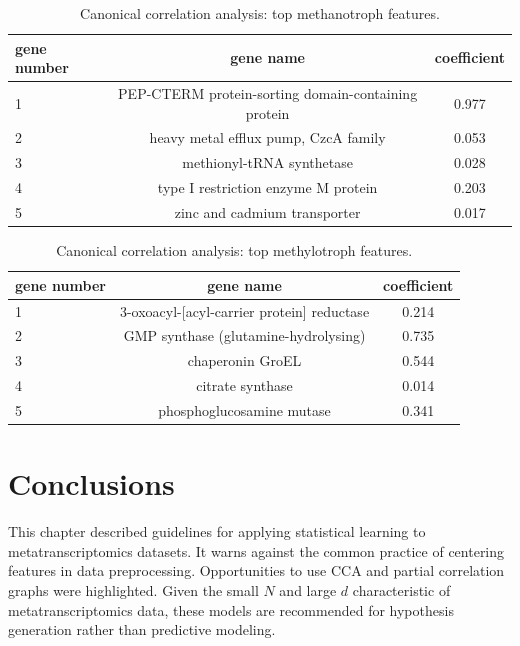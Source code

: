 \begin{table}[H]
\centering
\begin{singlespace}
\caption[Canonical correlation analysis: top methanotroph features]{Canonical correlation analysis: top methanotroph features.}
\begin{tabular}{l | c | c}
          gene number & gene name & coefficient  \\
\midrule
	1 & PEP-CTERM protein-sorting domain-containing  protein & 0.977  \\
	2 & heavy metal efflux pump, CzcA family &  0.053  \\
	3 & methionyl-tRNA synthetase &  0.028 \\
	4 & type I restriction enzyme M protein &  0.203 \\
	5 & zinc and cadmium transporter &  0.017 \\
\end{tabular}
\label{table:CCA_methanotroph}
\end{singlespace}
\end{table}

\begin{table}[H]
\centering
\begin{singlespace}
\caption[Canonical correlation analysis: top methylotroph features]{Canonical correlation analysis: top methylotroph features.}
\begin{tabular}{l | c | c}
          gene number & gene name & coefficient  \\
\midrule
	1 & 3-oxoacyl-[acyl-carrier protein] reductase & 0.214 \\
	2 & GMP synthase (glutamine-hydrolysing) & 0.735 \\
	3 & chaperonin GroEL & 0.544 \\
	4 & citrate synthase & 0.014 \\
	5 & phosphoglucosamine mutase & 0.341 \\
\end{tabular}
\label{table:CCA_methylotroph}
\end{singlespace}
\end{table}

\section{Conclusions}

This chapter described guidelines for applying statistical learning to metatranscriptomics datasets.
It warns against the common practice of centering features in data preprocessing.
Opportunities to use CCA and partial correlation graphs were highlighted.
Given the small $N$ and large $d$ characteristic of metatranscriptomics data, these models are recommended for hypothesis generation rather than predictive modeling.

